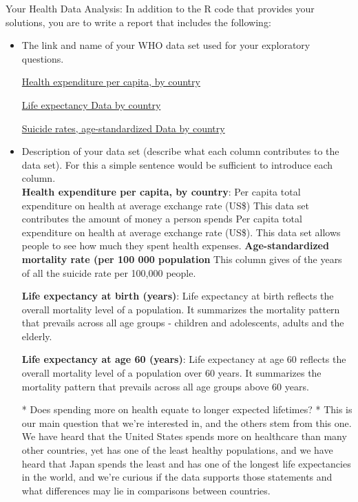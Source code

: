\documentclass[11pt]{article}
\begin{document}
\begin{enemerate}

\item Your Health Data Analysis: In addition to the R code that provides your solutions, you
are to write a report that includes the following:

\begin{itemize}
\item The link and name of your WHO data set used for your exploratory questions.

\href{http://apps.who.int/gho/data/node.main.78?lang=en}{Health expenditure per capita, by country}

\href{http://apps.who.int/gho/data/view.main.SDG2016LEXv?lang=en}{Life expectancy
Data by country} 

\href{http://apps.who.int/gho/data/node.main.MHSUICIDEASDR?lang=en}{Suicide rates, age-standardized
Data by country} 

\item  Description of your data set (describe what each column contributes to the data set).
For this a simple sentence would be sufficient to introduce each column.\\
\textbf {Health expenditure per capita, by country}: Per capita total expenditure on health at average exchange rate (US\$)
This data set contributes the amount of money a person spends Per capita total expenditure on health at average exchange rate (US\$). This data set allows people to see how much they spent health expenses. 
\textbf{Age-standardized mortality rate (per 100 000 population}
This column gives of the years of all the suicide rate per 100,000 people. 

\textbf{Life expectancy at birth (years)}:
Life expectancy at birth reflects the overall mortality level of a population. It summarizes the mortality pattern that prevails across all age groups - children and adolescents, adults and the elderly.

\textbf{Life expectancy at age 60 (years)}:
Life expectancy at age 60 reflects the overall mortality level of a population over 60 years. It summarizes the mortality pattern that prevails across all age groups above 60 years.





* Does spending more on health equate to longer expected lifetimes?
  * This is our main question that we're interested in, and the others stem from
    this one.  We have heard that the United States spends more on healthcare
    than many other countries, yet has one of the least healthy populations, and
    we have heard that Japan spends the least and has one of the longest life
    expectancies in the world, and we're curious if the data supports those
    statements and what differences may lie in comparisons between countries.


\end{itemize}
\end{enemerate}
\end{document}
